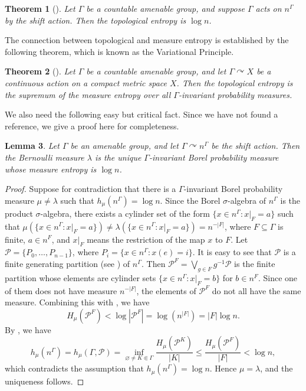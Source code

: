 \documentclass[11pt, reqno, a4paper]{amsart}
\theoremstyle{plain}
\newtheorem{theorem}{Theorem}[section]
\newtheorem{lemma}[theorem]{Lemma}
\theoremstyle{definition}
\theoremstyle{remark}
\begin{document}
\begin{theorem}[{\cite[Example 9.41]{KL16}}]
Let $\Gamma$ be a countable amenable group, and suppose $\Gamma$ acts on $n^\Gamma$ by the shift action. Then the topological entropy is $\log n$.
\end{theorem}




The connection between topological and measure entropy is established by the following theorem, which is known as the Variational Principle. 

\begin{theorem}[{\cite[Theorem 9.48]{KL16}}]\label{variational}
Let $\Gamma$ be a countable amenable group, and let $\Gamma \curvearrowright X$ be a continuous action on a compact metric space $X$. Then the topological entropy is the supremum of the measure entropy over all $\Gamma$-invariant probability measures.
\end{theorem}




We also need the following easy but critical fact. Since we have not found a reference, we give a proof here for completeness.


\begin{lemma}\label{uniqueness}
Let $\Gamma$ be an amenable group, and let $\Gamma \curvearrowright n^\Gamma$ be the shift action. Then the Bernoulli measure $\lambda$ is the unique $\Gamma$-invariant Borel probability measure whose measure entropy is $\log n$.
\end{lemma}
\begin{proof}
 Suppose for contradiction that there is a $\Gamma$-invariant Borel probability measure $\mu\ne\lambda$ such that $h_\mu(n^\Gamma)=\log n$. Since the Borel $\sigma$-algebra of $n^\Gamma$ is the product $\sigma$-algebra, there exists a cylinder set of the form $\{x\in n^\Gamma:x|_F=a\}$ such that $\mu(\{x\in n^\Gamma:x|_F=a\})\ne\lambda(\{x\in n^\Gamma:x|_F=a\})=n^{-|F|}$, where $F\subseteq\Gamma$ is finite,  $a\in n^F$, and $x|_F$ means the restriction of the map $x$ to $F$. Let $\mathcal{P}=\{P_0,\ldots,P_{n-1}\}$, where $P_i=\{x\in n^\Gamma:x(e)=i\}$. It is easy to see that $\mathcal{P}$ is a finite generating partition (see \cite[Definition 9.7]{KL16} ) of $n^\Gamma$. Then $\mathcal{P}^F=\bigvee_{g\in F}g^{-1}\mathcal{P}$ is the finite partition whose elements are cylinder sets $\{x\in n^\Gamma:x|_F=b\}$ for $b\in n^F$. Since one of them does not have measure $n^{-|F|}$, the elements of $\mathcal{P}^F$ do not all have the same measure. Combining this with \cite[Proposition 9.1 (2)]{KL16}, we have
\[
H_\mu(\mathcal{P}^F)<\log|\mathcal{P}^F|=\log(n^{|F|})=|F|\log n.
\]
By  \cite[Theorem 9.8]{KL16}, we have
\[
h_\mu(n^\Gamma)=h_{\mu}(\Gamma, \mathcal{P})=\inf_{\varnothing\ne K\Subset\Gamma}\frac{H_\mu(\mathcal{P}^K)}{|K|}\le\frac{H_\mu(\mathcal{P}^F)}{|F|}<\log n,
\]
which contradicts the assumption that $h_\mu(n^\Gamma)=\log n$. Hence $\mu=\lambda$, and the uniqueness follows. \end{proof}
\end{document}
